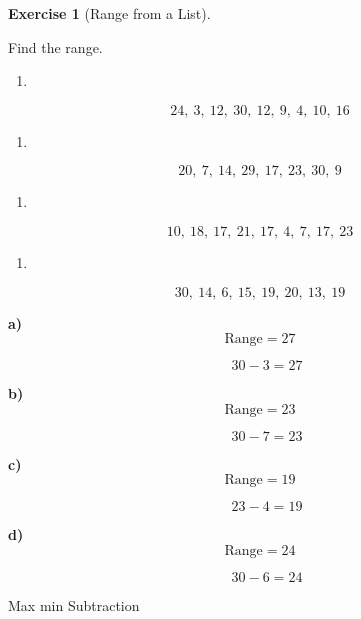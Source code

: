 \documentclass[
  letterpaper,
  DIV=11,
  numbers=noendperiod]{scrreprt}
\providecommand{\tightlist}{%
  \setlength{\itemsep}{0pt}\setlength{\parskip}{0pt}}
\theoremstyle{definition}
\newtheorem{exercise}{Exercise}[chapter]
\theoremstyle{remark}
\begin{document}
\begin{exercise}[Range from a
List]\protect\hypertarget{exr-avg-4}{}\label{exr-avg-4}

Find the range.

\begin{enumerate}
\def\labelenumi{\alph{enumi})}
\tightlist
\item
\end{enumerate}

\[24,\ 3,\ 12,\ 30,\ 12,\ 9,\ 4,\ 10,\ 16\]

\begin{enumerate}
\def\labelenumi{\alph{enumi})}
\setcounter{enumi}{1}
\tightlist
\item
\end{enumerate}

\[20,\ 7,\ 14,\ 29,\ 17,\ 23,\ 30,\ 9\]

\begin{enumerate}
\def\labelenumi{\alph{enumi})}
\setcounter{enumi}{2}
\tightlist
\item
\end{enumerate}

\[10,\ 18,\ 17,\ 21,\ 17,\ 4,\ 7,\ 17,\ 23\]

\begin{enumerate}
\def\labelenumi{\alph{enumi})}
\setcounter{enumi}{3}
\tightlist
\item
\end{enumerate}

\[30,\ 14,\ 6,\ 15,\ 19,\ 20,\ 13,\ 19\]

\begin{tcolorbox}[enhanced jigsaw, opacitybacktitle=0.6, coltitle=black, arc=.35mm, colframe=quarto-callout-tip-color-frame, colback=white, bottomrule=.15mm, left=2mm, colbacktitle=quarto-callout-tip-color!10!white, titlerule=0mm, opacityback=0, title=\textcolor{quarto-callout-tip-color}{\faLightbulb}\hspace{0.5em}{🔍 View Solution}, leftrule=.75mm, breakable, rightrule=.15mm, bottomtitle=1mm, toptitle=1mm, toprule=.15mm]

\textbf{a)} \[\text{Range} = 27\]

\[\quad 30 - 3 = 27\]

\textbf{b)} \[\text{Range} = 23\]

\[\quad 30 - 7 = 23\]

\textbf{c)} \[\text{Range} = 19\]

\[\quad 23 - 4 = 19\]

\textbf{d)} \[\text{Range} = 24\]

\[\quad 30 - 6 = 24\]

\end{tcolorbox}

{Max min} {Subtraction}

\end{exercise}
\end{document}
